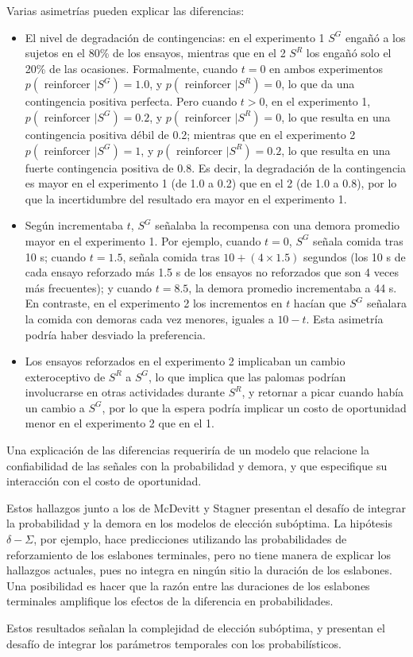 \documentclass[a4paper,12pt]{article}
\begin{document}
Varias asimetrías pueden explicar las diferencias:
\begin{itemize}
    \item El nivel de degradación de contingencias: en el experimento 1 $S^{G}$ engañó a los sujetos en el 80\% de los ensayos, mientras que en el 2 $S^{R}$ los engañó solo el 20\% de las ocasiones.
	Formalmente, cuando $t = 0$ en ambos experimentos $p (\text{ reinforcer } | S^{G}) = 1.0$, y $p (\text{ reinforcer } | S^{R}) = 0$, lo que da una contingencia positiva perfecta.
	Pero cuando $t > 0$, en el experimento 1, $p (\text{ reinforcer } | S^{G}) = 0.2$, y $p (\text{ reinforcer } | S^{R}) = 0$, lo que resulta en una contingencia positiva débil de 0.2; mientras que en el experimento 2 $p (\text{ reinforcer } | S^{G}) = 1$, y $p (\text{ reinforcer } | S^{R}) = 0.2$, lo que resulta en una fuerte contingencia positiva de 0.8.
	Es decir, la degradación de la contingencia es mayor en el experimento 1 (de 1.0 a 0.2) que en el 2 (de 1.0 a 0.8), por lo que la incertidumbre del resultado era mayor en el experimento 1.
    \item Según incrementaba $t$, $S^{G}$ señalaba la recompensa con una demora promedio mayor en el experimento 1.
	Por ejemplo, cuando $t = 0$, $S^{G}$ señala comida tras 10 s; cuando $t = 1.5$, señala comida tras $10 + (4 \times 1.5)$ segundos (los 10 s de cada ensayo reforzado más 1.5 s de los ensayos no reforzados que son 4 veces más frecuentes); y cuando $t = 8.5$, la demora promedio incrementaba a 44 s.
	En contraste, en el experimento 2 los incrementos en $t$ hacían que $S^{G}$ señalara la comida con demoras cada vez menores, iguales a $10 - t$.
	Esta asimetría podría haber desviado la preferencia.
    \item Los ensayos reforzados en el experimento 2 implicaban un cambio exteroceptivo de $S^{R}$ a $S^{G}$, lo que implica que las palomas podrían involucrarse en otras actividades durante $S^{R}$, y retornar a picar cuando había un cambio a $S^{G}$, por lo que la espera podría implicar un costo de oportunidad menor en el experimento 2 que en el 1.
\end{itemize}

Una explicación de las diferencias requeriría de un modelo que relacione la confiabilidad de las señales con la probabilidad y demora, y que especifique su interacción con el costo de oportunidad.

Estos hallazgos junto a los de McDevitt y Stagner presentan el desafío de integrar la probabilidad y la demora en los modelos de elección subóptima.
La hipótesis $\delta-\Sigma$, por ejemplo, hace predicciones utilizando las probabilidades de reforzamiento de los eslabones terminales, pero no tiene manera de explicar los hallazgos actuales, pues no integra en ningún sitio la duración de los eslabones.
Una posibilidad es hacer que la razón entre las duraciones de los eslabones terminales amplifique los efectos de la diferencia en probabilidades.

Estos resultados señalan la complejidad de elección subóptima, y presentan el desafío de integrar los parámetros temporales con los probabilísticos.
\end{document}
